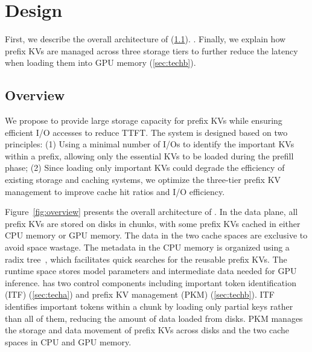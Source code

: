 \section{\pname{} Design}
\label{design_mainpart}

First, we describe the overall architecture of \pname{} (\cref{sec:overview}). 
.
Finally, we explain how prefix KVs are managed across three storage tiers 
to further reduce the latency when loading them into GPU memory (\cref{sec:techb}).

\subsection{Overview}
\label{sec:overview}




We propose \pname{} to provide large storage capacity for prefix KVs while
ensuring efficient I/O accesses to reduce TTFT. The system is designed based on
two principles: (1) Using a minimal number of I/Os to identify the
important KVs within a prefix, allowing only the essential KVs to be loaded
during the prefill phase; (2) Since loading only important KVs could degrade
the efficiency of existing storage and caching systems, we optimize the
three-tier prefix KV management to improve cache hit
ratios and I/O efficiency.

Figure~\ref{fig:overview} presents the overall architecture of \pname{}. 
In the data plane, all prefix KVs are stored on disks in chunks, with some
prefix KVs cached in either CPU memory or GPU memory. The data in the two cache
spaces are exclusive to avoid space wastage. The metadata in the CPU memory is
organized using a radix tree~\cite{sglang-arxiv23}, which facilitates quick
searches for the reusable prefix KVs.
The runtime
space stores model parameters and intermediate data needed for GPU
inference.
\pname{} has two control components including important token identification (ITF) (\cref{sec:techa}) and 
prefix KV management (PKM) (\cref{sec:techb}).  ITF identifies important tokens within a chunk by loading 
only partial keys rather than all of them, reducing the amount of data loaded from disks. 
PKM manages the storage and data movement of prefix KVs across disks and the two cache spaces in CPU and GPU memory.

